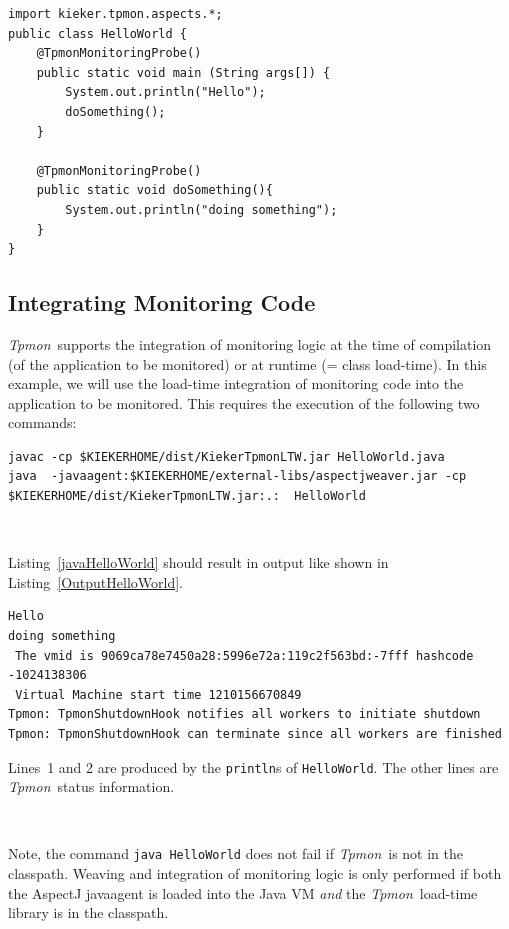 \documentclass[a4paper,12pt]{scrartcl}
\newcommand{\tpmon}{\textit{Tpmon}}
\begin{document}
\begin{lstlisting}[caption={Lines 1, 3 and 9 are added to instrument this simple ``Hello World'' Java program.},label={placingAnnotation}]
import kieker.tpmon.aspects.*;
public class HelloWorld {
	@TpmonMonitoringProbe()
	public static void main (String args[]) {
		System.out.println("Hello");
		doSomething();
	}
	
	@TpmonMonitoringProbe()
	public static void doSomething(){
		System.out.println("doing something");
	}
}
\end{lstlisting}

\subsection{Integrating Monitoring Code}
\tpmon\ supports the integration of monitoring logic at the time of compilation (of the application to be monitored) or at runtime (= class load-time). In this example, we will use the load-time integration of monitoring code into the application to be monitored. This requires the execution of the following two commands:

\begin{lstlisting}[caption={Compilation and execution with AspectJ's Java agent.},label={javaHelloWorld}]
javac -cp $KIEKERHOME/dist/KiekerTpmonLTW.jar HelloWorld.java
java  -javaagent:$KIEKERHOME/external-libs/aspectjweaver.jar -cp $KIEKERHOME/dist/KiekerTpmonLTW.jar:.:  HelloWorld
\end{lstlisting}

\

Listing~\ref{javaHelloWorld} should result in output like shown in Listing~\ref{OutputHelloWorld}.
\begin{lstlisting}[caption={Compilation and execution with AspectJ's Java agent.},label={OutputHelloWorld}]
Hello
doing something
 The vmid is 9069ca78e7450a28:5996e72a:119c2f563bd:-7fff hashcode -1024138306
 Virtual Machine start time 1210156670849
Tpmon: TpmonShutdownHook notifies all workers to initiate shutdown
Tpmon: TpmonShutdownHook can terminate since all workers are finished
\end{lstlisting}
Lines~1 and 2 are produced by the \texttt{println}s of \texttt{HelloWorld}. The other lines are \tpmon\ status information.

\

Note, the command \texttt{java  HelloWorld} does not fail if  \tpmon\ is not in the classpath. Weaving and integration of monitoring logic is only performed if both the AspectJ javaagent is loaded into the Java VM \textit{and} the \tpmon\ load-time library is in the classpath.
\end{document}
